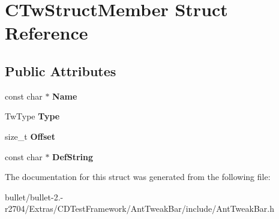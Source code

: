 \hypertarget{struct_c_tw_struct_member}{\section{C\+Tw\+Struct\+Member Struct Reference}
\label{struct_c_tw_struct_member}
}
\subsection*{Public Attributes}
\begin{DoxyCompactItemize}
\item 
\hypertarget{struct_c_tw_struct_member_a479a5c49a185f7902eeab9eb67677263}{const char $\ast$ {\bfseries Name}}\label{struct_c_tw_struct_member_a479a5c49a185f7902eeab9eb67677263}

\item 
\hypertarget{struct_c_tw_struct_member_ae0cbefc1430a6a56c7a0bbb5c1530e14}{Tw\+Type {\bfseries Type}}\label{struct_c_tw_struct_member_ae0cbefc1430a6a56c7a0bbb5c1530e14}

\item 
\hypertarget{struct_c_tw_struct_member_abe124eb9da8e2fe54503598ac7d8cdf4}{size\+\_\+t {\bfseries Offset}}\label{struct_c_tw_struct_member_abe124eb9da8e2fe54503598ac7d8cdf4}

\item 
\hypertarget{struct_c_tw_struct_member_aec7ad30961b7ff18d5d1bc4437a133df}{const char $\ast$ {\bfseries Def\+String}}\label{struct_c_tw_struct_member_aec7ad30961b7ff18d5d1bc4437a133df}

\end{DoxyCompactItemize}


The documentation for this struct was generated from the following file\+:\begin{DoxyCompactItemize}
\item 
bullet/bullet-\/2.-\/r2704/\+Extras/\+C\+D\+Test\+Framework/\+Ant\+Tweak\+Bar/include/Ant\+Tweak\+Bar.\+h\end{DoxyCompactItemize}
